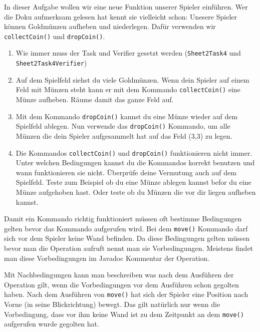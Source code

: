 

In dieser Aufgabe wollen wir eine neue Funktion unserer Spieler einführen. 
Wer die Doku aufmerksam gelesen hat kennt sie vielleicht schon: 
Unesere Spieler können Goldmünzen aufheben und niederlegen. 
Dafür verwenden wir \lstinline{collectCoin()} und \lstinline{dropCoin()}.

\begin{enumerate}
    \item Wie immer muss der Task und Verifier gesetzt werden (\lstinline{Sheet2Task4} und \lstinline{Sheet2Task4Verifier})
    \item Auf dem Spielfeld siehst du viele Goldmünzen.
        Wenn dein Spieler auf einem Feld mit Münzen steht kann er mit dem Kommando \lstinline{collectCoin()} eine Münze aufheben.
        Räume damit das ganze Feld auf.
    \item Mit dem Kommando \lstinline{dropCoin()} kannst du eine Münze wieder auf dem Spielfeld ablegen.
        Nun verwende das \lstinline{dropCoin()} Kommando, um alle Münzen die dein Spieler aufgesammelt hat auf das Feld (3,3) zu legen.
    \item Die Kommandos \lstinline{collectCoin()} und \lstinline{dropCoin()} funktionieren nicht immer.
        Unter welchen Bedingungen kannst du die Kommandos korrekt benutzen und wann funktionieren sie nicht.
        Überprüfe deine Vermutung auch auf dem Spielfeld.
        Teste zum Beispiel ob du eine Münze ablegen kannst befor du eine Münze aufgehoben hast.
        Oder teste ob du Münzen die vor dir liegen aufheben kannst.
\end{enumerate}


\begin{Infobox}
    Damit ein Kommando richtig funktioniert müssen oft bestimme Bedingungen gelten bevor das Kommando aufgerufen wird.
    Bei dem \lstinline{move()} Kommando darf sich vor dem Spieler keine Wand befinden.
    Da diese Bedingungen gelten müssen bevor man die Operation aufruft nennt man sie Vorbedingungen.
    Meistens findet man diese Vorbedingungen im Javadoc Kommentar der Operation.

    Mit Nachbedingungen kann man beschreiben was nach dem Ausführen der Operation gilt, wenn die Vorbedingungen vor dem Ausführen schon gegolten haben.
    Nach dem Ausführen von \lstinline{move()} hat sich der Spieler eine Position nach Vorne (in seine Blickrichtung) bewegt.
    Das gilt natürlich nur wenn die Vorbedingung, dass vor ihm keine Wand ist zu dem Zeitpunkt an dem \lstinline{move()} aufgerufen wurde gegolten hat.
\end{Infobox}
